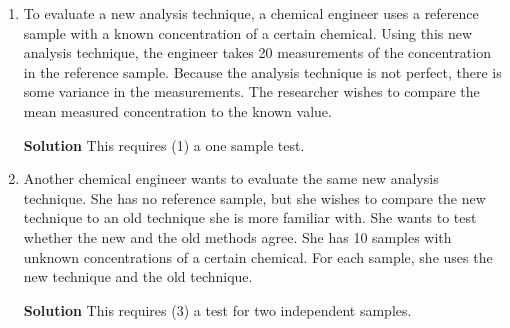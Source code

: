 \begin{enumerate}
\begin{enumerate}
        \item To evaluate a new analysis technique, a chemical engineer uses a reference sample with a known concentration of a certain chemical. Using this new analysis technique, the engineer takes 20 measurements of the concentration in the reference sample. Because the analysis technique is not perfect, there is some variance in the measurements. The researcher wishes to compare the mean measured concentration to the known value.
        \begin{framed}{\textbf{Solution}}
        This requires (1) a one sample test.
        \end{framed}
        
        \item Another chemical engineer wants to evaluate the same new analysis technique. She has no reference sample, but she wishes to compare the new technique to an old technique she is more familiar with. She wants to test whether the new and the old methods agree. She has 10 samples with unknown concentrations of a certain chemical. For each sample, she uses the new technique and the old technique.
        \begin{framed}{\textbf{Solution}}
        This requires (3) a test for two independent samples.
        \end{framed}
    \end{enumerate}
    

\end{enumerate}
